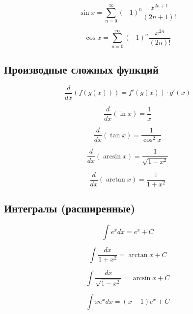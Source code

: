 \documentclass[a4paper,12pt]{article}
\begin{document}
\begin{equation}
\sin x = \sum_{n=0}^{\infty} (-1)^n \frac{x^{2n+1}}{(2n+1)!}
\end{equation}

\begin{equation}
\cos x = \sum_{n=0}^{\infty} (-1)^n \frac{x^{2n}}{(2n)!}
\end{equation}

\subsection{Производные сложных функций}
\setcounter{equation}{0}

\begin{equation}
\frac{d}{dx}(f(g(x))) = f'(g(x)) \cdot g'(x)
\end{equation}

\begin{equation}
\frac{d}{dx}(\ln x) = \frac{1}{x}
\end{equation}

\begin{equation}
\frac{d}{dx}(\tan x) = \frac{1}{\cos^2 x}
\end{equation}

\begin{equation}
\frac{d}{dx}(\arcsin x) = \frac{1}{\sqrt{1-x^2}}
\end{equation}

\begin{equation}
\frac{d}{dx}(\arctan x) = \frac{1}{1+x^2}
\end{equation}

\subsection{Интегралы (расширенные)}
\setcounter{equation}{0}

\begin{equation}
\int e^x dx = e^x + C
\end{equation}

\begin{equation}
\int \frac{dx}{1+x^2} = \arctan x + C
\end{equation}

\begin{equation}
\int \frac{dx}{\sqrt{1-x^2}} = \arcsin x + C
\end{equation}

\begin{equation}
\int x e^x dx = (x-1)e^x + C
\end{equation}
\end{document}
